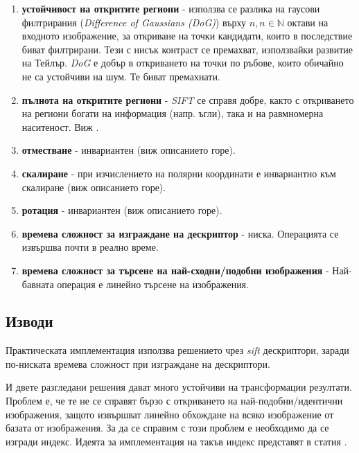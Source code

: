 \documentclass[a4paper,12pt]{article}
\begin{document}
\begin{enumerate}
    \item \textbf{устойчивост на откритите региони} - използва се разлика на гаусови филтрирания (\textit{Difference of Gaussians (DoG)}) върху $n, n \in \mathbb{N}$ октави на входното изображение, за откриване на точки кандидати, които в последствие биват филтрирани. Тези с нисък контраст се премахват, използвайки развитие на Тейлър. \textit{DoG} е добър в откриването на точки по ръбове, които обичайно не са устойчиви на шум. Те биват премахнати.
    \item \textbf{пълнота на откритите региони} - \textit{SIFT} се справя добре, както с откриването на региони богати на информация (напр. ъгли), така и на равмномерна наситеност. Виж \cite{sift}.
    \item \textbf{отместване} - инвариантен (виж описанието горе).
    \item \textbf{скалиране} - при изчислението на полярни координати е инвариантно към скалиране (виж описанието горе).
    \item \textbf{ротация} - инвариантен (виж описанието горе). 
    \item \textbf{времева сложност за изграждане на дескриптор} - ниска. Операцията се извършва почти в реално време.
    \item \textbf{времева сложност за търсене на най-сходни/подобни изображения} - Най-бавната операция е линейно търсене на изображения.
\end{enumerate}

\subsection{Изводи}

Практическата имплементация използва решението чрез \textit{sift} дескриптори, заради по-ниската времева сложност при изграждане на дескриптори.

\bigbreak

И двете разгледани решения дават много устойчиви на трансформации резултати. Проблем е, че те не се справят бързо с откриването на най-подобни/идентични изображения, защото извършват линейно обхождане на всяко изображение от базата от изображения. За да се справим с този проблем е необходимо да се изгради индекс. Идеята за имплементация на такъв индекс представят в статия \cite{vocabularytree}.

\end{document}
